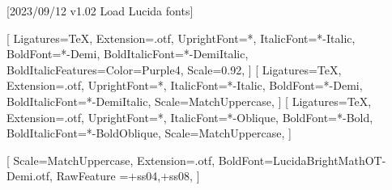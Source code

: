 
[2023/09/12 v1.02 Load Lucida fonts]



\ifpdftex
\RequirePackage[LY1]{fontenc}
\RequirePackage{bm}
\else
\RequirePackage[warnings-off={mathtools-colon,mathtools-overbracket}]{unicode-math}

%

\setmainfont{LucidaBrightOT}[%
  Ligatures=TeX,
  Extension=.otf,
  UprightFont=*,
  ItalicFont=*-Italic,
  BoldFont=*-Demi,
  BoldItalicFont=*-DemiItalic,
  BoldItalicFeatures={Color=Purple4},
  Scale=0.92,
]
%
\setsansfont{LucidaSansOT}[%
  Ligatures=TeX,
  Extension=.otf,
  UprightFont=*,
  ItalicFont=*-Italic,
  BoldFont=*-Demi,
  BoldItalicFont=*-DemiItalic,
  Scale=MatchUppercase,
]
%
\setmonofont{LucidaSansTypewriterOT}[%
  Ligatures=TeX,
  Extension=.otf,
  UprightFont=*,
  ItalicFont=*-Oblique,
  BoldFont=*-Bold,
  BoldItalicFont=*-BoldOblique,
  Scale=MatchUppercase,
]

%
%
[%
  Scale=MatchUppercase,
  Extension=.otf,
  BoldFont=LucidaBrightMathOT-Demi.otf,
  RawFeature ={+ss04,+ss08}, %
]

